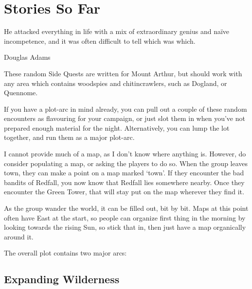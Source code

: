 \chapter{Stories So Far}
	\epigraph{He attacked everything in life with a mix of extraordinary genius and na\"ive incompetence, and it was often difficult to tell which was which.}{Douglas Adams}

\begin{multicols}{2}

\noindent
These random Side Quests are written for Mount Arthur, but should work with any area which contains woodspies and chitincrawlers, such as Dogland, or Quennome.

If you have a plot-arc in mind already, you can pull out a couple of these random encounters as flavouring for your campaign, or just slot them in when you've not prepared enough material for the night.
Alternatively, you can lump the lot together, and run them as a major plot-arc.

I cannot provide much of a map, as I don't know where anything is.
However, do consider populating a map, or asking the players to do so.
When the group leaves town, they can make a point on a map marked `town'.
If they encounter the bad bandits of Redfall, you now know that Redfall lies somewhere nearby.
Once they encounter the Green Tower, that will stay put on the map wherever they find it.

As the group wander the world, it can be filled out, bit by bit.
Maps at this point often have East at the start, so people can organize first thing in the morning by looking towards the rising Sun, so stick that in, then just have a map organically around it.

The overall plot contains two major arcs:

\end{multicols}

\section{Expanding Wilderness}

